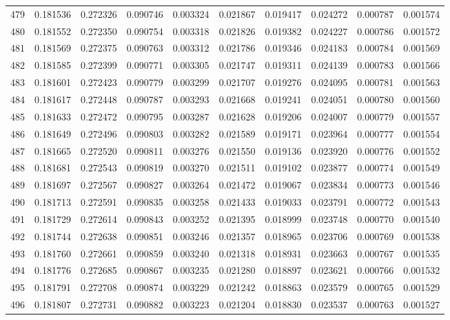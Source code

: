 \begin{tabular}{lrrrrrrrrr}
479 & 0.181536 & 0.272326 & 0.090746 & 0.003324 & 0.021867 & 0.019417 & 0.024272 & 0.000787 & 0.001574 \\
480 & 0.181552 & 0.272350 & 0.090754 & 0.003318 & 0.021826 & 0.019382 & 0.024227 & 0.000786 & 0.001572 \\
481 & 0.181569 & 0.272375 & 0.090763 & 0.003312 & 0.021786 & 0.019346 & 0.024183 & 0.000784 & 0.001569 \\
482 & 0.181585 & 0.272399 & 0.090771 & 0.003305 & 0.021747 & 0.019311 & 0.024139 & 0.000783 & 0.001566 \\
483 & 0.181601 & 0.272423 & 0.090779 & 0.003299 & 0.021707 & 0.019276 & 0.024095 & 0.000781 & 0.001563 \\
484 & 0.181617 & 0.272448 & 0.090787 & 0.003293 & 0.021668 & 0.019241 & 0.024051 & 0.000780 & 0.001560 \\
485 & 0.181633 & 0.272472 & 0.090795 & 0.003287 & 0.021628 & 0.019206 & 0.024007 & 0.000779 & 0.001557 \\
486 & 0.181649 & 0.272496 & 0.090803 & 0.003282 & 0.021589 & 0.019171 & 0.023964 & 0.000777 & 0.001554 \\
487 & 0.181665 & 0.272520 & 0.090811 & 0.003276 & 0.021550 & 0.019136 & 0.023920 & 0.000776 & 0.001552 \\
488 & 0.181681 & 0.272543 & 0.090819 & 0.003270 & 0.021511 & 0.019102 & 0.023877 & 0.000774 & 0.001549 \\
489 & 0.181697 & 0.272567 & 0.090827 & 0.003264 & 0.021472 & 0.019067 & 0.023834 & 0.000773 & 0.001546 \\
490 & 0.181713 & 0.272591 & 0.090835 & 0.003258 & 0.021433 & 0.019033 & 0.023791 & 0.000772 & 0.001543 \\
491 & 0.181729 & 0.272614 & 0.090843 & 0.003252 & 0.021395 & 0.018999 & 0.023748 & 0.000770 & 0.001540 \\
492 & 0.181744 & 0.272638 & 0.090851 & 0.003246 & 0.021357 & 0.018965 & 0.023706 & 0.000769 & 0.001538 \\
493 & 0.181760 & 0.272661 & 0.090859 & 0.003240 & 0.021318 & 0.018931 & 0.023663 & 0.000767 & 0.001535 \\
494 & 0.181776 & 0.272685 & 0.090867 & 0.003235 & 0.021280 & 0.018897 & 0.023621 & 0.000766 & 0.001532 \\
495 & 0.181791 & 0.272708 & 0.090874 & 0.003229 & 0.021242 & 0.018863 & 0.023579 & 0.000765 & 0.001529 \\
496 & 0.181807 & 0.272731 & 0.090882 & 0.003223 & 0.021204 & 0.018830 & 0.023537 & 0.000763 & 0.001527 \\

\end{tabular}
